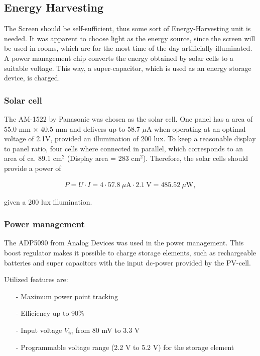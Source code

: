 \subsection{Energy Harvesting}
The Screen should be self-sufficient, thus some sort of Energy-Harvesting unit is needed.
It was apparent to choose light as the energy source, since the screen will be used in rooms, which are for the most time of the day artificially illuminated.
A power management chip converts the energy  obtained by solar cells to a suitable voltage.
This way, a super-capacitor, which is used as an energy storage device, is charged.

\subsubsection{Solar cell}
The AM-1522 by Panasonic was chosen as the solar cell.
One panel has a area of 55.0 mm $\times$ 40.5 mm and delivers up to 58.7 $\mu\text{A}$ when operating at an optimal voltage of 2.1V, provided an illumination of 200 lux.
To keep a reasonable display to panel ratio, four cells where connected in parallel, which corresponds to an area of ca. 89.1 cm$^2$ (Display area = 283 cm$^2$). Therefore, the solar cells should provide a power of

\begin{align}
	P = U\cdot I = 4\cdot 57.8\ \mu\text{A}\cdot 2.1\ \text{V}=485.52\ \mu \text{W},\label{development:cell_power}
\end{align}

given a 200 lux illumination. \cite{amorton}

\subsubsection{Power management}
The ADP5090 from Analog Devices was used in the power management.
This boost regulator makes it possible to charge storage elements, such as rechargeable batteries and super capacitors with the input dc-power provided by the PV-cell.

Utilized features are:
\begin{itemize}
	\item[-] Maximum power point tracking
	\item[-] Efficiency up to 90\%
	\item[-] Input voltage $V_{in}$ from 80 mV to 3.3 V
	\item[-] Programmable voltage range (2.2 V to 5.2 V) for the storage element
\end{itemize}

